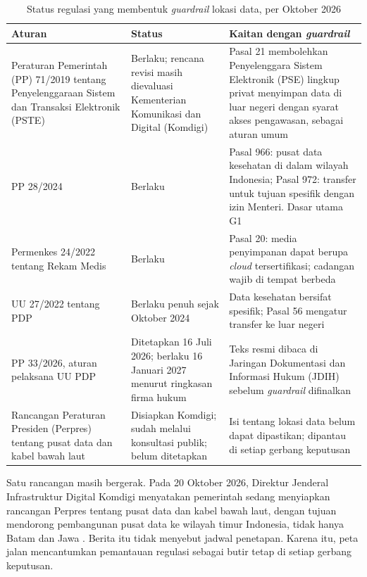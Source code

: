 \begin{table}[!htb]
  \centering
  \caption{Status regulasi yang membentuk \textit{guardrail} lokasi data, per Oktober 2026}
  \label{tab:ch14-regulasi}
  \footnotesize
  \begin{tabularx}{\textwidth}{>{\raggedright\arraybackslash}p{3.4cm}
      >{\raggedright\arraybackslash}p{3.6cm} >{\raggedright\arraybackslash}X}
    \hline
    \textbf{Aturan} & \textbf{Status} & \textbf{Kaitan dengan \textit{guardrail}} \\ \hline
    Peraturan Pemerintah (PP) 71/2019 tentang Penyelenggaraan Sistem dan Transaksi Elektronik (PSTE)
      \cite{pp71-2019} & Berlaku; rencana revisi masih dievaluasi Kementerian Komunikasi dan Digital
      (Komdigi) & Pasal 21 membolehkan Penyelenggara Sistem Elektronik (PSE) lingkup privat menyimpan
      data di luar negeri dengan syarat akses pengawasan, sebagai aturan umum \\ \hline
    PP 28/2024 \cite{pp28-2024-kesehatan} & Berlaku & Pasal 966: pusat data kesehatan di dalam wilayah
      Indonesia; Pasal 972: transfer untuk tujuan spesifik dengan izin Menteri. Dasar utama G1 \\
      \hline
    Permenkes 24/2022 tentang Rekam Medis \cite{permenkes24-2022} & Berlaku & Pasal 20: media
      penyimpanan dapat berupa \textit{cloud} tersertifikasi; cadangan wajib di tempat berbeda \\
      \hline
    UU 27/2022 tentang PDP \cite{uu27-2022-pdp} & Berlaku penuh sejak Oktober 2024 &
      Data kesehatan bersifat spesifik; Pasal 56 mengatur transfer ke luar negeri \\ \hline
    PP 33/2026, aturan pelaksana UU PDP \cite{pp33-2026} & Ditetapkan 16 Juli 2026; berlaku 16
      Januari 2027 menurut ringkasan firma hukum & Teks resmi dibaca di Jaringan Dokumentasi dan
      Informasi Hukum (JDIH) sebelum \textit{guardrail} difinalkan \\ \hline
    Rancangan Peraturan Presiden (Perpres) tentang pusat data dan kabel bawah laut
      \cite{c14-bisnis-perpres-dc} & Disiapkan Komdigi; sudah melalui konsultasi publik; belum
      ditetapkan & Isi tentang lokasi data belum dapat dipastikan; dipantau di setiap gerbang
      keputusan \\ \hline
  \end{tabularx}
\end{table}

Satu rancangan masih bergerak. Pada 20 Oktober 2026, Direktur Jenderal Infrastruktur Digital Komdigi
menyatakan pemerintah sedang menyiapkan rancangan Perpres tentang pusat data dan kabel bawah laut,
dengan tujuan mendorong pembangunan pusat data ke wilayah timur Indonesia, tidak hanya Batam dan
Jawa \cite{c14-bisnis-perpres-dc}. Berita itu tidak menyebut jadwal penetapan. Karena itu, peta jalan
mencantumkan pemantauan regulasi sebagai butir tetap di setiap gerbang keputusan.

